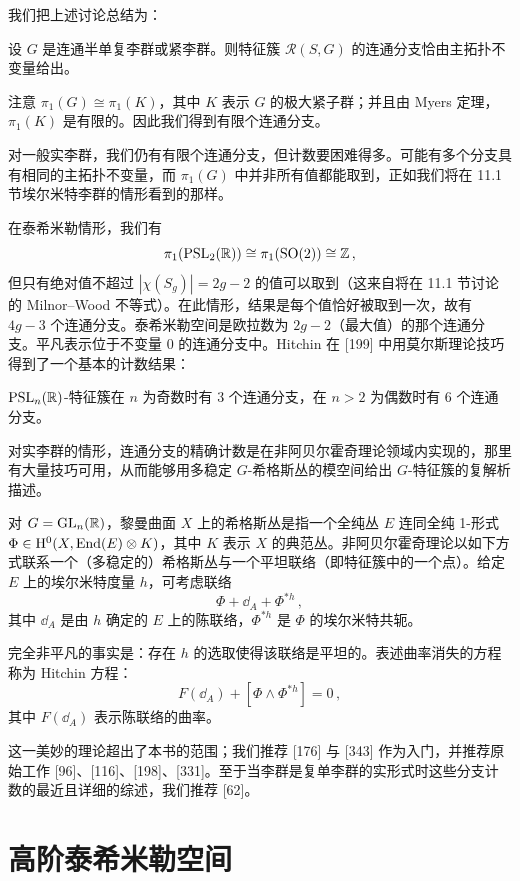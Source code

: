 我们把上述讨论总结为：

\begin{theorem}[9.7] 设 $G$ 是连通半单复李群或紧李群。则特征簇 $\mathcal{R}(S,G)$ 的连通分支恰由主拓扑不变量给出。\end{theorem}

注意 $\pi_1(G)\cong\pi_1(K)$，其中 $K$ 表示 $G$ 的极大紧子群；并且由 Myers 定理，$\pi_1(K)$ 是有限的。因此我们得到有限个连通分支。

对一般实李群，我们仍有有限个连通分支，但计数要困难得多。可能有多个分支具有相同的主拓扑不变量，而 $\pi_1(G)$ 中并非所有值都能取到，正如我们将在 11.1 节埃尔米特李群的情形看到的那样。

在泰希米勒情形，我们有
\[
\pi_1(\operatorname{PSL}_2(\mathbb{R}))\cong\pi_1(\operatorname{SO}(2))\cong\mathbb{Z}\,,
\]
但只有绝对值不超过 $|\chi(S_g)|=2g-2$ 的值可以取到（这来自将在 11.1 节讨论的 Milnor–Wood 不等式）。在此情形，结果是每个值恰好被取到一次，故有 $4g-3$ 个连通分支。泰希米勒空间是欧拉数为 $2g-2$（最大值）的那个连通分支。平凡表示位于不变量 $0$ 的连通分支中。Hitchin 在 [199] 中用莫尔斯理论技巧得到了一个基本的计数结果：

\begin{theorem}[9.8] $\operatorname{PSL}_n(\mathbb{R})$-特征簇在 $n$ 为奇数时有 3 个连通分支，在 $n>2$ 为偶数时有 6 个连通分支。\end{theorem}

对实李群的情形，连通分支的精确计数是在非阿贝尔霍奇理论领域内实现的，那里有大量技巧可用，从而能够用多稳定 $G$-希格斯丛的模空间给出 $G$-特征簇的复解析描述。

对 $G=\operatorname{GL}_n(\mathbb{R})$，黎曼曲面 $X$ 上的希格斯丛是指一个全纯丛 $E$ 连同全纯 1-形式 $\Phi\in\mathrm{H}^0(X,\operatorname{End}(E)\otimes K)$，其中 $K$ 表示 $X$ 的典范丛。非阿贝尔霍奇理论以如下方式联系一个（多稳定的）希格斯丛与一个平坦联络（即特征簇中的一个点）。给定 $E$ 上的埃尔米特度量 $h$，可考虑联络
\[
\Phi+\dd_A+\Phi^{*h}\,,
\]
其中 $\dd_A$ 是由 $h$ 确定的 $E$ 上的陈联络，$\Phi^{*h}$ 是 $\Phi$ 的埃尔米特共轭。

完全非平凡的事实是：存在 $h$ 的选取使得该联络是平坦的。表述曲率消失的方程称为 Hitchin 方程：
\[
F(\dd_A)+[\Phi\wedge\Phi^{*h}]=0\,,
\]
其中 $F(\dd_A)$ 表示陈联络的曲率。

这一美妙的理论超出了本书的范围；我们推荐 [176] 与 [343] 作为入门，并推荐原始工作 [96]、[116]、[198]、[331]。至于当李群是复单李群的实形式时这些分支计数的最近且详细的综述，我们推荐 [62]。

\section{高阶泰希米勒空间}

